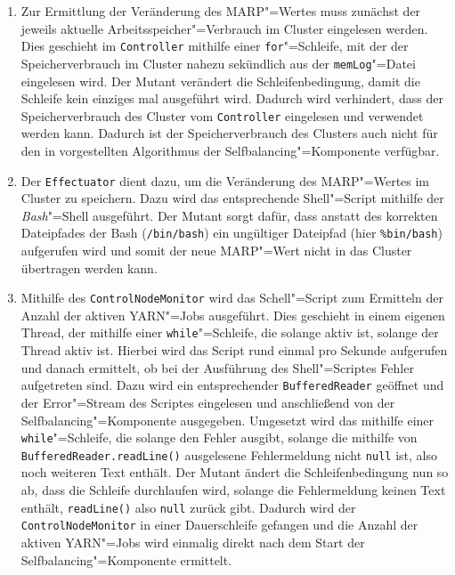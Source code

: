 \begin{enumerate}
    \item
    Zur Ermittlung der Veränderung des \ac{MARP}"=Wertes muss zunächst der jeweils aktuelle Arbeitsspeicher"=Verbrauch im Cluster eingelesen werden.
    Dies geschieht im \texttt{Controller} mithilfe einer \texttt{for}"=Schleife, mit der der Speicherverbrauch im Cluster nahezu sekündlich aus der \texttt{memLog}"=Datei eingelesen wird.
    Der Mutant verändert die Schleifenbedingung, damit die Schleife kein einziges mal ausgeführt wird.
    Dadurch wird verhindert, dass der Speicherverbrauch des Cluster vom \texttt{Controller} eingelesen und verwendet werden kann.
    Dadurch ist der Speicherverbrauch des Clusters auch nicht für den in \cite{zhang2016} vorgestellten Algorithmus der Selfbalancing"=Komponente verfügbar.
    
    \item 
    Der \texttt{Effectuator} dient dazu, um die Veränderung des \ac{MARP}"=Wertes im Cluster zu speichern.
    Dazu wird das entsprechende Shell"=Script mithilfe der \emph{Bash}"=Shell ausgeführt.
    Der Mutant sorgt dafür, dass anstatt des korrekten Dateipfades der Bash (\texttt{/bin/bash}) ein ungültiger Dateipfad (hier \texttt{\%bin/bash}) aufgerufen wird und somit der neue \ac{MARP}"=Wert nicht in das Cluster übertragen werden kann.
    
    \item
    Mithilfe des \texttt{ControlNodeMonitor} wird das Schell"=Script zum Ermitteln der Anzahl der aktiven \ac{YARN}"=Jobs ausgeführt.
    Dies geschieht in einem eigenen Thread, der mithilfe einer \texttt{while}"=Schleife, die solange aktiv ist, solange der Thread aktiv ist.
    Hierbei wird das Script rund einmal pro Sekunde aufgerufen und danach ermittelt, ob bei der Ausführung des Shell"=Scriptes Fehler aufgetreten sind.
    Dazu wird ein entsprechender \texttt{BufferedReader} geöffnet und der Error"=Stream des Scriptes eingelesen und anschließend von der Selfbalancing"=Komponente ausgegeben.
    Umgesetzt wird das mithilfe einer \texttt{while}"=Schleife, die solange den Fehler ausgibt, solange die mithilfe von \texttt{BufferedReader.readLine()} ausgelesene Fehlermeldung nicht \texttt{null} ist, also noch weiteren Text enthält.
    Der Mutant ändert die Schleifenbedingung nun so ab, dass die Schleife durchlaufen wird, solange die Fehlermeldung keinen Text enthält, \texttt{readLine()} also \texttt{null} zurück gibt.
    Dadurch wird der \texttt{ControlNodeMonitor} in einer Dauerschleife gefangen und die Anzahl der aktiven \ac{YARN}"=Jobs wird einmalig direkt nach dem Start der Selfbalancing"=Komponente ermittelt.
            

\end{enumerate}
